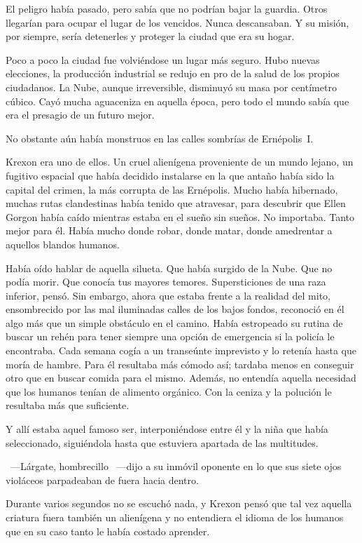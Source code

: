 El peligro había pasado, pero sabía que no podrían bajar la guardia. Otros llegarían para ocupar el lugar de los vencidos. Nunca descansaban. Y su misión, por siempre, sería detenerles y proteger la ciudad que era su hogar.

\fancyparbreak
Poco a poco la ciudad fue volviéndose un lugar más seguro. Hubo nuevas elecciones, la producción industrial se redujo en pro de la salud de los propios ciudadanos. La Nube, aunque irreversible, disminuyó su masa por centímetro cúbico. Cayó mucha aguaceniza en aquella época, pero todo el mundo sabía que era el presagio de un futuro mejor.

No obstante aún había monstruos en las calles sombrías de Ernépolis~I.

Krexon era uno de ellos. Un cruel alienígena proveniente de un mundo lejano, un fugitivo espacial que había decidido instalarse en la que antaño había sido la capital del crimen, la más corrupta de las Ernépolis. Mucho había hibernado, muchas rutas clandestinas había tenido que atravesar, para descubrir que Ellen Gorgon había caído mientras estaba en el sueño sin sueños. No importaba. Tanto mejor para él. Había mucho donde robar, donde matar, donde amedrentar a aquellos blandos humanos.

Había oído hablar de aquella silueta. Que había surgido de la Nube. Que no podía morir. Que conocía tus mayores temores. Supersticiones de una raza inferior, pensó. Sin embargo, ahora que estaba frente a la realidad del mito, ensombrecido por las mal iluminadas calles de los bajos fondos, reconoció en él algo más que un simple obstáculo en el camino. Había estropeado su rutina de buscar un rehén para tener siempre una opción de emergencia si la policía le encontraba. Cada semana cogía a un transeúnte imprevisto y lo retenía hasta que moría de hambre. Para él resultaba más cómodo así; tardaba menos en conseguir otro que en buscar comida para el mismo. Además, no entendía aquella necesidad que los humanos tenían de alimento orgánico. Con la ceniza y la polución le resultaba más que suficiente.

Y allí estaba aquel famoso ser, interponiéndose entre él y la niña que había seleccionado, siguiéndola hasta que estuviera apartada de las multitudes.

~---Lárgate, hombrecillo ~---dijo a su inmóvil oponente en lo que sus siete ojos violáceos parpadeaban de fuera hacia dentro.

Durante varios segundos no se escuchó nada, y Krexon pensó que tal vez aquella criatura fuera también un alienígena y no entendiera el idioma de los humanos que en su caso tanto le había costado aprender.

